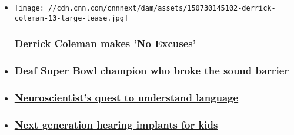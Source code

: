 \begin{itemize}
\item
  \href{/2015/08/06/health/derrick-coleman-seahawks-deaf/index.html}{}

  \texttt{[image: //cdn.cnn.com/cnnnext/dam/assets/150730145102-derrick-coleman-13-large-tease.jpg]}

  \hypertarget{derrick-coleman-makes-no-excuses}{%
  \subsubsection{\texorpdfstring{\href{/2015/08/06/health/derrick-coleman-seahawks-deaf/index.html}{Derrick
  Coleman makes 'No
  Excuses'}}{Derrick Coleman makes 'No Excuses'}}\label{derrick-coleman-makes-no-excuses}}
\item
  \hypertarget{deaf-super-bowl-champion-who-broke-the-sound-barrier}{%
  \subsubsection{\texorpdfstring{\href{/videos/intl_tv-shows/2015/07/17/hearing-loss-deafness-vital-signs-spc-a.cnn}{Deaf
  Super Bowl champion who broke the sound
  barrier}}{Deaf Super Bowl champion who broke the sound barrier}}\label{deaf-super-bowl-champion-who-broke-the-sound-barrier}}
\item
  \hypertarget{neuroscientists-quest-to-understand-language}{%
  \subsubsection{\texorpdfstring{\href{/videos/intl_tv-shows/2015/07/17/hearing-loss-deafness-vital-signs-spc-b.cnn}{Neuroscientist's
  quest to understand
  language}}{Neuroscientist's quest to understand language}}\label{neuroscientists-quest-to-understand-language}}
\item
  \hypertarget{next-generation-hearing-implants-for-kids}{%
  \subsubsection{\texorpdfstring{\href{/videos/intl_tv-shows/2015/07/17/hearing-loss-deafness-vital-signs-spc-c.cnn}{Next
  generation hearing implants for
  kids}}{Next generation hearing implants for kids}}\label{next-generation-hearing-implants-for-kids}}
\end{itemize}


